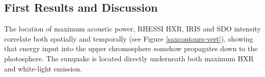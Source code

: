 \subsection{First Results and Discussion}

The location of maximum acoustic power, RHESSI HXR, IRIS and SDO intensity correlate both spatially and temporally (see Figure \ref{saxcontours-vert}), showing that energy input into the upper chromosphere somehow propagates down to the photosphere. The sunquake is located directly underneath both maximum HXR and white-light emission. 


